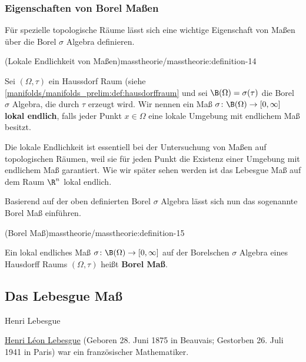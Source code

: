\documentclass[letterpaper,10pt,german]{jupyterBook}
\begin{document}
\subsubsection{Eigenschaften von Borel Maßen}
\label{\detokenize{masstheorie/masstheorie:eigenschaften-von-borel-maszen}}
\par
Für spezielle topologische Räume lässt sich eine wichtige Eigenschaft von Maßen über die Borel \(\sigma\) Algebra definieren.
\begin{definition}{(Lokale Endlichkeit von Maßen)}{masstheorie/masstheorie:definition-14}



\par
Sei \((\Omega, \tau)\) ein Haussdorf Raum (siehe \cref{manifolds/manifolds_prelim:def:hausdorffraum}  und sei \(\B(\Omega) = \sigma(\tau)\) die Borel \(\sigma\) Algebra, die durch \(\tau\) erzeugt wird.
Wir nennen ein Maß \(\sigma \colon \B(\Omega) \rightarrow [0, \infty]\) \textbf{lokal endlich}, falls jeder Punkt \(x \in \Omega\) eine lokale Umgebung mit endlichem Maß besitzt.
\end{definition}

\par
Die lokale Endlichkeit ist essentiell bei der Untersuchung von Maßen auf topologischen Räumen, weil sie für jeden Punkt die Existenz einer Umgebung mit endlichem Maß garantiert.
Wie wir später sehen werden ist das Lebesgue Maß auf dem Raum \(\R^n\) lokal endlich.

\par
Basierend auf der oben definierten Borel \(\sigma\) Algebra lässt sich nun das sogenannte Borel Maß einführen.
\begin{definition}{(Borel Maß)}{masstheorie/masstheorie:definition-15}



\par
Ein lokal endliches Maß \(\sigma \colon \B(\Omega) \rightarrow [0, \infty]\) auf der Borelschen \(\sigma\) Algebra eines Hausdorff Raums \((\Omega,\tau)\) heißt \textbf{Borel Maß}.
\end{definition}


\subsection{Das Lebesgue Maß}
\label{\detokenize{masstheorie/masstheorie:das-lebesgue-masz}}\label{\detokenize{masstheorie/masstheorie:s-lebesguemeasure}}
\begin{emphBox}{Henri Lebesgue}{}

\par
\href{https://en.wikipedia.org/wiki/Henri\_Lebesgue}{Henri Léon Lebesgue} (Geboren 28. Juni 1875 in Beauvais; Gestorben 26. Juli 1941 in Paris) war ein französischer Mathematiker.
\end{emphBox}
\end{document}

